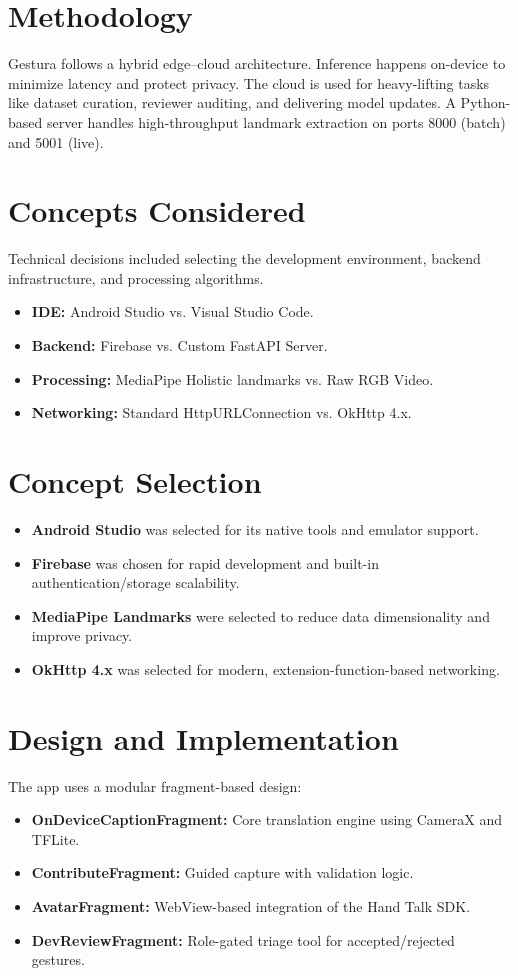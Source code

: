 \documentclass[conference]{IEEEtran}
\begin{document}
\section{Methodology}
Gestura follows a hybrid edge–cloud architecture. Inference happens on-device to minimize latency and protect privacy. The cloud is used for heavy-lifting tasks like dataset curation, reviewer auditing, and delivering model updates. A Python-based server handles high-throughput landmark extraction on ports 8000 (batch) and 5001 (live).

\section{Concepts Considered}
Technical decisions included selecting the development environment, backend infrastructure, and processing algorithms.
\begin{itemize}
    \item \textbf{IDE:} Android Studio vs. Visual Studio Code.
    \item \textbf{Backend:} Firebase vs. Custom FastAPI Server.
    \item \textbf{Processing:} MediaPipe Holistic landmarks vs. Raw RGB Video.
    \item \textbf{Networking:} Standard HttpURLConnection vs. OkHttp 4.x.
\end{itemize}

\section{Concept Selection}
\begin{itemize}
    \item \textbf{Android Studio} was selected for its native tools and emulator support.
    \item \textbf{Firebase} was chosen for rapid development and built-in authentication/storage scalability.
    \item \textbf{MediaPipe Landmarks} were selected to reduce data dimensionality and improve privacy.
    \item \textbf{OkHttp 4.x} was selected for modern, extension-function-based networking.
\end{itemize}

\section{Design and Implementation}
The app uses a modular fragment-based design:
\begin{itemize}
    \item \textbf{OnDeviceCaptionFragment:} Core translation engine using CameraX and TFLite.
    \item \textbf{ContributeFragment:} Guided capture with validation logic.
    \item \textbf{AvatarFragment:} WebView-based integration of the Hand Talk SDK.
    \item \textbf{DevReviewFragment:} Role-gated triage tool for accepted/rejected gestures.
\end{itemize}
\end{document}
